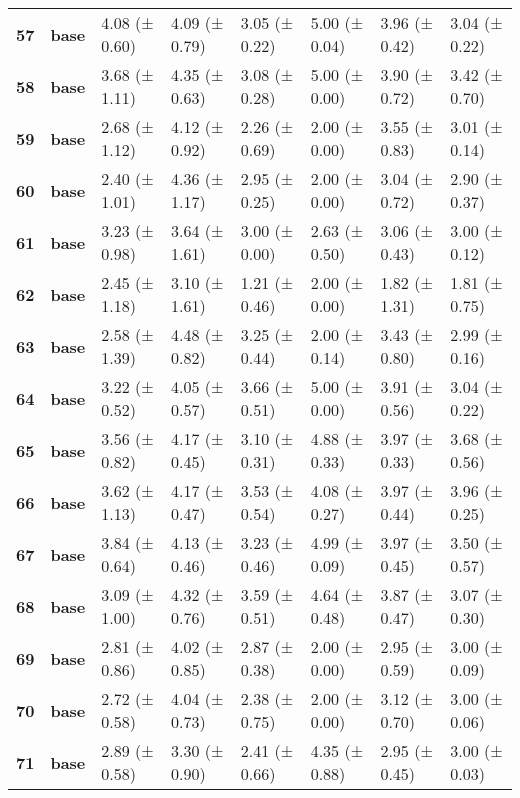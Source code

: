 \begin{longtable}{llllllll}
\cline{1-8}
\textbf{57} & \textbf{base} & 4.08 (± 0.60) & 4.09 (± 0.79) & 3.05 (± 0.22) & 5.00 (± 0.04) & 3.96 (± 0.42) & 3.04 (± 0.22) \\
\cline{1-8}
\textbf{58} & \textbf{base} & 3.68 (± 1.11) & 4.35 (± 0.63) & 3.08 (± 0.28) & 5.00 (± 0.00) & 3.90 (± 0.72) & 3.42 (± 0.70) \\
\cline{1-8}
\textbf{59} & \textbf{base} & 2.68 (± 1.12) & 4.12 (± 0.92) & 2.26 (± 0.69) & 2.00 (± 0.00) & 3.55 (± 0.83) & 3.01 (± 0.14) \\
\cline{1-8}
\textbf{60} & \textbf{base} & 2.40 (± 1.01) & 4.36 (± 1.17) & 2.95 (± 0.25) & 2.00 (± 0.00) & 3.04 (± 0.72) & 2.90 (± 0.37) \\
\cline{1-8}
\textbf{61} & \textbf{base} & 3.23 (± 0.98) & 3.64 (± 1.61) & 3.00 (± 0.00) & 2.63 (± 0.50) & 3.06 (± 0.43) & 3.00 (± 0.12) \\
\cline{1-8}
\textbf{62} & \textbf{base} & 2.45 (± 1.18) & 3.10 (± 1.61) & 1.21 (± 0.46) & 2.00 (± 0.00) & 1.82 (± 1.31) & 1.81 (± 0.75) \\
\cline{1-8}
\textbf{63} & \textbf{base} & 2.58 (± 1.39) & 4.48 (± 0.82) & 3.25 (± 0.44) & 2.00 (± 0.14) & 3.43 (± 0.80) & 2.99 (± 0.16) \\
\cline{1-8}
\textbf{64} & \textbf{base} & 3.22 (± 0.52) & 4.05 (± 0.57) & 3.66 (± 0.51) & 5.00 (± 0.00) & 3.91 (± 0.56) & 3.04 (± 0.22) \\
\cline{1-8}
\textbf{65} & \textbf{base} & 3.56 (± 0.82) & 4.17 (± 0.45) & 3.10 (± 0.31) & 4.88 (± 0.33) & 3.97 (± 0.33) & 3.68 (± 0.56) \\
\cline{1-8}
\textbf{66} & \textbf{base} & 3.62 (± 1.13) & 4.17 (± 0.47) & 3.53 (± 0.54) & 4.08 (± 0.27) & 3.97 (± 0.44) & 3.96 (± 0.25) \\
\cline{1-8}
\textbf{67} & \textbf{base} & 3.84 (± 0.64) & 4.13 (± 0.46) & 3.23 (± 0.46) & 4.99 (± 0.09) & 3.97 (± 0.45) & 3.50 (± 0.57) \\
\cline{1-8}
\textbf{68} & \textbf{base} & 3.09 (± 1.00) & 4.32 (± 0.76) & 3.59 (± 0.51) & 4.64 (± 0.48) & 3.87 (± 0.47) & 3.07 (± 0.30) \\
\cline{1-8}
\textbf{69} & \textbf{base} & 2.81 (± 0.86) & 4.02 (± 0.85) & 2.87 (± 0.38) & 2.00 (± 0.00) & 2.95 (± 0.59) & 3.00 (± 0.09) \\
\cline{1-8}
\textbf{70} & \textbf{base} & 2.72 (± 0.58) & 4.04 (± 0.73) & 2.38 (± 0.75) & 2.00 (± 0.00) & 3.12 (± 0.70) & 3.00 (± 0.06) \\
\cline{1-8}
\textbf{71} & \textbf{base} & 2.89 (± 0.58) & 3.30 (± 0.90) & 2.41 (± 0.66) & 4.35 (± 0.88) & 2.95 (± 0.45) & 3.00 (± 0.03) \\

\end{longtable}
